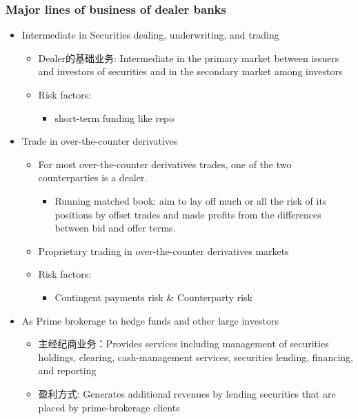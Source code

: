 \subsubsection{Major lines of business of dealer banks}
\begin{itemize}
\item Intermediate in Securities dealing, underwriting, and trading
    \begin{itemize}
    \item Dealer的基础业务: Intermediate in the primary market between issuers and investors of securities and in the secondary market among investors
    \item Risk factors:
        \begin{itemize}
        \item short-term funding like repo
        \end{itemize}
    \end{itemize}
    
\item Trade in over-the-counter derivatives
    \begin{itemize}
    \item For most over-the-counter derivatives trades, one of the two counterparties is a dealer.
        \begin{itemize}
        \item Running matched book: aim to lay off much or all the risk of its positions by offset trades and made profits from the differences between bid and offer terms.
        \end{itemize}
    \item Proprietary trading in over-the-counter derivatives markets
    \item Risk factors:
        \begin{itemize}
        \item Contingent payments risk \& Counterparty risk
        \end{itemize}
    \end{itemize}
    
\item As Prime brokerage to hedge funds and other large investors
    \begin{itemize}
    \item 主经纪商业务：Provides services including management of securities holdings, clearing, cash-management services, securities lending, financing, and reporting
    \item 盈利方式: Generates additional revenues by lending securities that are placed by prime-brokerage clients
    \end{itemize}
    

\end{itemize}
